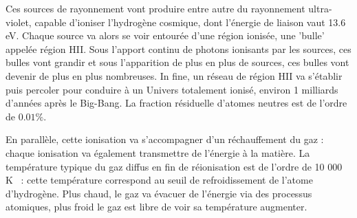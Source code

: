 Ces sources de rayonnement vont produire entre autre du rayonnement ultra-violet, capable d'ioniser l'hydrogène cosmique, dont l'énergie de liaison vaut 13.6 eV. Chaque source va alors se voir entourée d'une région ionisée, une 'bulle' appelée région HII. Sous l'apport continu de photons ionisants par les sources, ces bulles vont grandir et sous l'apparition de plus en plus de sources, ces bulles vont devenir de plus en plus nombreuses. In fine, un réseau de région HII va s'établir puis percoler pour conduire à un Univers totalement ionisé, environ 1 milliards d'années après le Big-Bang. La fraction résiduelle d'atomes neutres est de l'ordre de $0.01\%$.

En parallèle, cette ionisation va s'accompagner d'un réchauffement du gaz : chaque ionisation va également transmettre de l'énergie à la matière. La température typique du gaz diffus en fin de réionisation est de l'ordre de 10 000 K ~: cette température correspond au seuil de refroidissement de l'atome d'hydrogène. Plus chaud, le gaz va évacuer de l'énergie via des processus atomiques, plus froid le gaz est libre de voir sa température augmenter.

